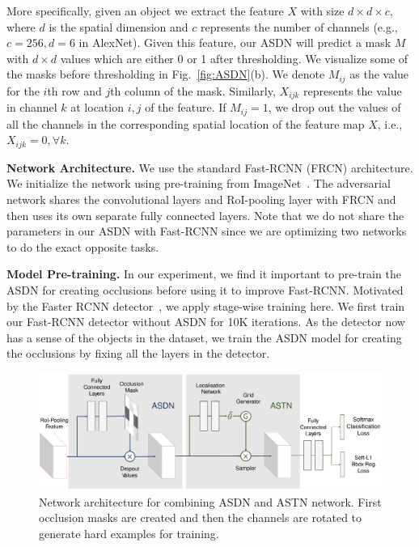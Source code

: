 More specifically, given an object we extract the feature $X$ with size $d \times d \times c$, where $d$ is the spatial dimension and  $c$ represents the number of channels (e.g., $c=256, d=6$ in AlexNet). Given this feature, our ASDN will predict a mask $M$ with $d \times d$ values which are either 0 or 1 after thresholding. We visualize some of the masks before thresholding in Fig.~\ref{fig:ASDN}(b). We denote $M_{ij}$ as the value for the $i$th row and $j$th column of the mask. Similarly, $X_{ijk}$ represents the value in channel $k$ at location $i,j$ of the feature. If $M_{ij} = 1$, we drop out the values of all the channels in the corresponding spatial location of the feature map $X$, i.e., $X_{ijk} = 0, \forall k$. 

\textbf{Network Architecture.} We use the standard Fast-RCNN (FRCN) architecture. We initialize the network using pre-training from ImageNet~\cite{imagenet}.  The adversarial network shares the convolutional layers and RoI-pooling layer with FRCN and then uses its own separate fully connected layers. Note that we do not share the parameters in our ASDN with Fast-RCNN since we are optimizing two networks to do the exact opposite tasks. 

\textbf{Model Pre-training.} In our experiment, we find it important to pre-train the ASDN for creating occlusions before using it to improve Fast-RCNN. Motivated by the Faster RCNN detector~\cite{renNIPS15fasterrcnn}, we apply stage-wise training here. We first train our Fast-RCNN detector without ASDN for 10K iterations. As the detector now has a sense of the objects in the dataset, we train the ASDN model for creating the occlusions by fixing all the layers in the detector.

\begin{figure}[t]
    \centering
    \includegraphics[width=1\textwidth]{network_fusion.pdf}
    \caption{Network architecture for combining ASDN and ASTN network. First occlusion masks are created and then the channels are rotated to generate hard examples for training.}\label{fig:network_fusion}
\end{figure}

